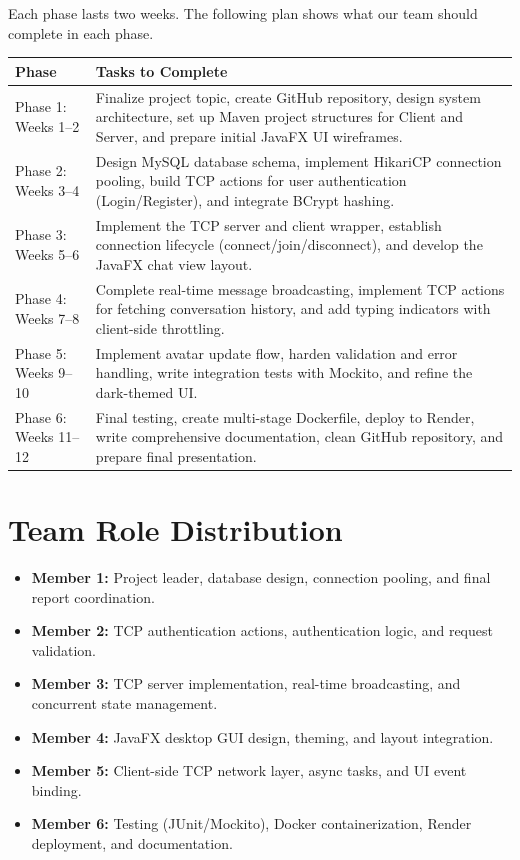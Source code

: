 \documentclass[11pt]{article}
\begin{document}
Each phase lasts two weeks. The following plan shows what our team should complete in each phase.

\begin{longtable}{>{\raggedright\arraybackslash}p{} >{\raggedright\arraybackslash}p{}}
\toprule
\textbf{Phase} & \textbf{Tasks to Complete} \\
\midrule
Phase 1: Weeks 1--2 & Finalize project topic, create GitHub repository, design system architecture, set up Maven project structures for Client and Server, and prepare initial JavaFX UI wireframes. \\
\midrule
Phase 2: Weeks 3--4 & Design MySQL database schema, implement HikariCP connection pooling, build TCP actions for user authentication (Login/Register), and integrate BCrypt hashing. \\
\midrule
Phase 3: Weeks 5--6 & Implement the TCP server and client wrapper, establish connection lifecycle (connect/join/disconnect), and develop the JavaFX chat view layout. \\
\midrule
Phase 4: Weeks 7--8 & Complete real-time message broadcasting, implement TCP actions for fetching conversation history, and add typing indicators with client-side throttling. \\
\midrule
Phase 5: Weeks 9--10 & Implement avatar update flow, harden validation and error handling, write integration tests with Mockito, and refine the dark-themed UI. \\
\midrule
Phase 6: Weeks 11--12 & Final testing, create multi-stage Dockerfile, deploy to Render, write comprehensive documentation, clean GitHub repository, and prepare final presentation. \\
\bottomrule
\end{longtable}

\section{Team Role Distribution}

\begin{itemize}
    \item \textbf{Member 1:} Project leader, database design, connection pooling, and final report coordination.
    \item \textbf{Member 2:} TCP authentication actions, authentication logic, and request validation.
    \item \textbf{Member 3:} TCP server implementation, real-time broadcasting, and concurrent state management.
    \item \textbf{Member 4:} JavaFX desktop GUI design, theming, and layout integration.
    \item \textbf{Member 5:} Client-side TCP network layer, async tasks, and UI event binding.
    \item \textbf{Member 6:} Testing (JUnit/Mockito), Docker containerization, Render deployment, and documentation.
\end{itemize}
\end{document}
